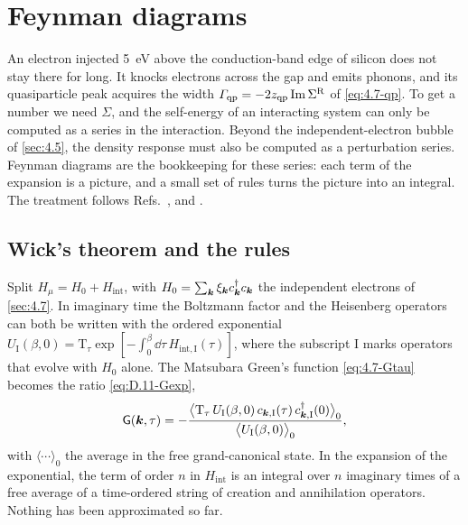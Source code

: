 \section{Feynman diagrams}\label{sec:4.8}

An electron injected \SI{5}{eV} above the conduction-band edge of silicon does not stay there for long. It knocks electrons across the gap and emits phonons, and its quasiparticle peak acquires the width $\varGamma_{\mathrm{qp}} = -2z_{\mathrm{qp}}\operatorname{Im}\Sigma^{\mathrm{R}}$ of \cref{eq:4.7-qp}. To get a number we need $\Sigma$, and the self-energy of an interacting system can only be computed as a series in the interaction. Beyond the independent-electron bubble of \cref{sec:4.5}, the density response must also be computed as a perturbation series. Feynman diagrams are the bookkeeping for these series: each term of the expansion is a picture, and a small set of rules turns the picture into an integral. The treatment follows Refs.~\cite{bruus2004many}, \cite[Chaps.~3 and 7]{fetter1971quantum} and \cite[Chaps.~2 and 3]{mahan2000many}.

\subsection{Wick's theorem and the rules}

Split $H_\mu = H_0 + H_{\mathrm{int}}$, with $H_0 = \sum_{\bm{k}}\xi_{\bm{k}}c^\dagger_{\bm{k}}c_{\bm{k}}$ the independent electrons of \cref{sec:4.7}. In imaginary time the Boltzmann factor and the Heisenberg operators can both be written with the ordered exponential $U_{\mathrm{I}}(\beta,0) = \mathrm{T}_\tau\exp[-\int_0^\beta\dd\tau\,H_{\mathrm{int},\mathrm{I}}(\tau)]$, where the subscript I marks operators that evolve with $H_0$ alone. The Matsubara Green's function \cref{eq:4.7-Gtau} becomes the ratio \cref{eq:D.11-Gexp},
\begin{equation*}
  \mathsf{G}(\bm{k},\tau) = -\frac{\bigl\langle\mathrm{T}_\tau\,U_{\mathrm{I}}(\beta,0)\,c_{\bm{k},\mathrm{I}}(\tau)\,c^\dagger_{\bm{k},\mathrm{I}}(0)\bigr\rangle_0}{\bigl\langle U_{\mathrm{I}}(\beta,0)\bigr\rangle_0} ,
\end{equation*}
with $\langle\cdots\rangle_0$ the average in the free grand-canonical state. In the expansion of the exponential, the term of order $n$ in $H_{\mathrm{int}}$ is an integral over $n$ imaginary times of a free average of a time-ordered string of creation and annihilation operators. Nothing has been approximated so far.


